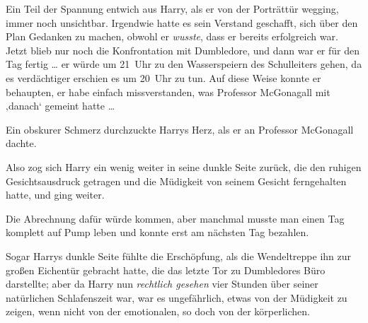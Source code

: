 Ein Teil der Spannung entwich aus Harry, als er von der Porträttür wegging, immer noch unsichtbar. Irgendwie hatte es sein Verstand geschafft, sich über den Plan Gedanken zu machen, obwohl er \emph{wusste}, dass er bereits erfolgreich war. Jetzt blieb nur noch die Konfrontation mit Dumbledore, und dann war er für den Tag fertig … er würde um 21~Uhr zu den Wasserspeiern des Schulleiters gehen, da es verdächtiger erschien es um 20~Uhr zu tun. Auf diese Weise konnte er behaupten, er habe einfach missverstanden, was Professor McGonagall mit ‚danach‘ gemeint hatte …

Ein obskurer Schmerz durchzuckte Harrys Herz, als er an Professor McGonagall dachte.

Also zog sich Harry ein wenig weiter in seine dunkle Seite zurück, die den ruhigen Gesichtsausdruck getragen und die Müdigkeit von seinem Gesicht ferngehalten hatte, und ging weiter.

Die Abrechnung dafür würde kommen, aber manchmal musste man einen Tag komplett auf Pump leben und konnte erst am nächsten Tag bezahlen.

\later

Sogar Harrys dunkle Seite fühlte die Erschöpfung, als die Wendeltreppe ihn zur großen Eichentür gebracht hatte, die das letzte Tor zu Dumbledores Büro darstellte; aber da Harry nun \emph{rechtlich gesehen} vier Stunden über seiner natürlichen Schlafenszeit war, war es ungefährlich, etwas von der Müdigkeit zu zeigen, wenn nicht von der emotionalen, so doch von der körperlichen.


